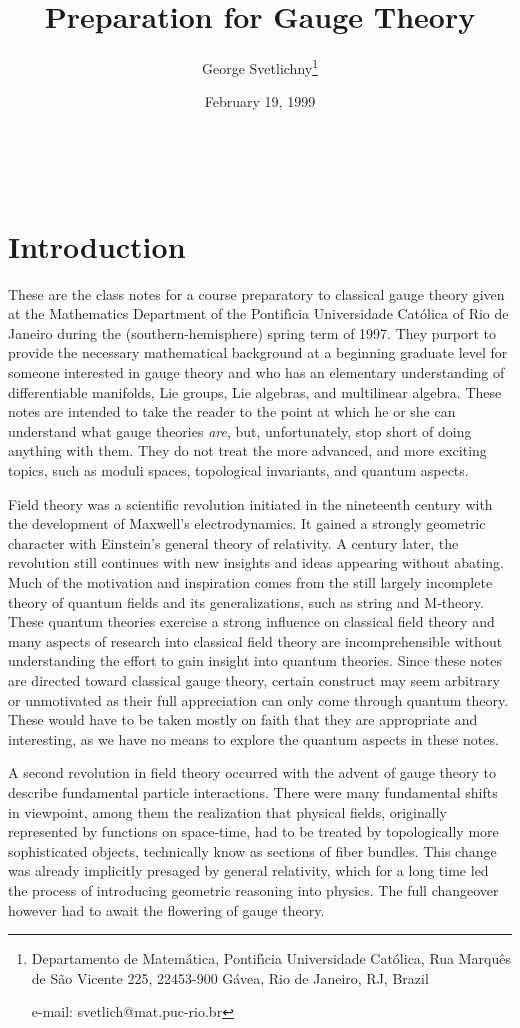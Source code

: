 \documentclass[12pt,titlepage]{article}
\title{Preparation for  Gauge Theory}
\author{George Svetlichny\thanks{Departamento de Matem\'atica, 
Pontif\'{\i}cia Universidade Cat\'olica, Rua Marqu\^es de S\~ao Vicente 225,
22453-900 G\'avea, Rio de Janeiro, RJ, Brazil\newline 
\centerline{e-mail: svetlich@mat.puc-rio.br}}}
\date{February 19, 1999}
\begin{document}
\maketitle
\pagestyle{empty}
\newpage\ \newpage
\pagestyle{plain}
\setcounter{page}{1}
\tableofcontents
\newpage
{}
\setcounter{page}{1}
\section{Introduction}
These are the class notes for a course preparatory to classical gauge
theory given at the Mathematics Department of the Pontif\'{\i}cia
Universidade Cat\'olica of Rio de Janeiro during the
(southern-hemisphere) spring term of 1997. They purport to provide the
necessary mathematical background at a beginning graduate level for
someone interested in gauge theory and who has an elementary
understanding of differentiable manifolds, Lie groups, Lie algebras, and
multilinear algebra. These notes are intended to take the reader to the
point at which he or she can understand what gauge theories {\em are\/},
but, unfortunately, stop short of doing anything with them. They do not
treat the
more advanced, and more
exciting topics, such as moduli spaces, topological invariants, and
quantum aspects.


Field theory was a scientific revolution initiated in the nineteenth
century with the development of Maxwell's electrodynamics. It gained a
strongly geometric character with Einstein's general theory
of relativity. A century later, the revolution still
continues with new insights and ideas appearing without abating. Much of
the motivation and inspiration comes from the still largely incomplete
theory of quantum fields and its generalizations, such as string and 
M-theory. These quantum  theories exercise a strong
influence on classical field theory and many aspects of research into
classical field theory are incomprehensible without understanding the
effort to gain insight into quantum theories. Since these notes are
directed toward classical gauge theory, certain construct may seem
arbitrary or unmotivated as their full appreciation can only come
through quantum theory. These would have to be taken mostly on faith
that they are appropriate and interesting, as we have no means to
explore the quantum aspects in these notes.

A second revolution in field theory occurred with the advent of gauge
theory to describe fundamental particle interactions. There were many
fundamental shifts in viewpoint, among them the realization that
physical fields, originally represented by functions on space-time, had
to be treated by topologically more sophisticated objects, technically
know as sections of fiber bundles. This change was already implicitly
presaged by general relativity, which for a long time led the process of
introducing geometric reasoning into physics. The full changeover
however had to await the flowering of gauge theory.
\end{document}
